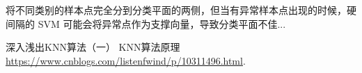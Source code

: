 \documentclass[forprint]{report}
\begin{document}
将不同类别的样本点完全分到分类平面的两侧，但当有异常样本点出现的时候，硬间隔的 SVM 可能会将异常点作为支撑向量，导致分类平面不佳\cite{r1}...



\cleardoublepage{}
{}
%
\renewcommand{\baselinestretch}{1.6}

\begin{thebibliography}{00}

   深入浅出KNN算法（一） KNN算法原理 \url{https://www.cnblogs.com/listenfwind/p/10311496.html}.

\end{thebibliography}

\cleardoublepage
\end{document}
